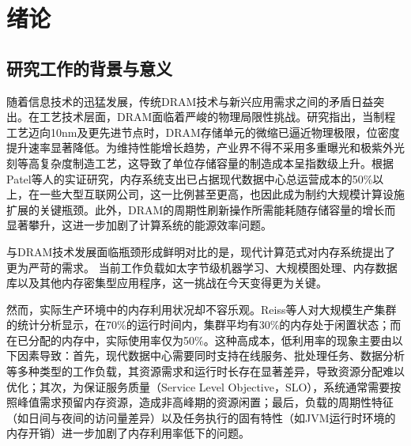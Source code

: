 \chapter{绪\hspace{6pt}论}


\section{研究工作的背景与意义}

随着信息技术的迅猛发展，传统DRAM技术与新兴应用需求之间的矛盾日益突出。在工艺技术层面，DRAM面临着严峻的物理局限性挑战。研究指出，当制程工艺迈向10nm及更先进节点时，DRAM存储单元的微缩已逼近物理极限，位密度提升速率显著降低。为维持性能增长趋势，产业界不得不采用多重曝光和极紫外光刻等高复杂度制造工艺，这导致了单位存储容量的制造成本呈指数级上升。根据Patel等人的实证研究，内存系统支出已占据现代数据中心总运营成本的50\%以上，在一些大型互联网公司，这一比例甚至更高，也因此成为制约大规模计算设施扩展的关键瓶颈。此外，DRAM的周期性刷新操作所需能耗随存储容量的增长而显著攀升，这进一步加剧了计算系统的能源效率问题。

与DRAM技术发展面临瓶颈形成鲜明对比的是，现代计算范式对内存系统提出了更为严苛的需求。
当前工作负载如太字节级机器学习、大规模图处理、内存数据库以及其他内存密集型应用程序，这一挑战在今天变得更为关键。


然而，实际生产环境中的内存利用状况却不容乐观。Reiss等人对大规模生产集群的统计分析显示，在70\%的运行时间内，集群平均有30\%的内存处于闲置状态；而在已分配的内存中，实际使用率仅为50\%。这种高成本，低利用率的现象主要由以下因素导致：首先，现代数据中心需要同时支持在线服务、批处理任务、数据分析等多种类型的工作负载，其资源需求和运行时长存在显著差异，导致资源分配难以优化；其次，为保证服务质量（Service Level Objective，SLO），系统通常需要按照峰值需求预留内存资源，造成非高峰期的资源闲置；最后，负载的周期性特征（如日间与夜间的访问量差异）以及任务执行的固有特性（如JVM运行时环境的内存开销）进一步加剧了内存利用率低下的问题。


